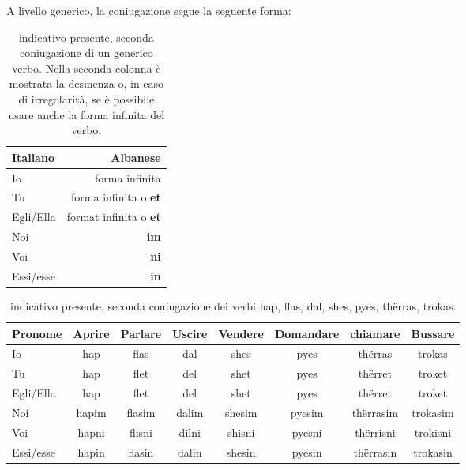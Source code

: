 A livello generico, la coniugazione segue la seguente forma:

\begin{table}[H]
    \centering
    \begin{tabular}{lr}
        \toprule
        Italiano    &   Albanese\\
        \midrule
        Io          &   forma infinita \\
        Tu          &   forma infinita o \textbf{et} \\
        Egli/Ella   &   format infinita o \textbf{et} \\
        Noi         &   \textbf{im} \\
        Voi         &   \textbf{ni} \\
        Essi/esse   &   \textbf{in} \\
        \bottomrule
    \end{tabular}
    \caption{indicativo presente, seconda coniugazione di un generico verbo. Nella seconda colonna è mostrata la desinenza o, in caso di irregolarità, se è possibile usare anche la forma infinita del verbo.}
    \label{tbl:verb:secondaconiugazione:indicativo:presente}
\end{table}

\begin{table}[H]
    \centering
    \begin{tabular}{lccccccc}
        \toprule
        Pronome     &   Aprire  & Parlare   & Uscire    & Vendere   & Domandare & chiamare & Bussare \\
        \midrule
        Io          &   hap     & flas      & dal       & shes      & pyes  & thërras   & trokas\\
        Tu          &   hap     & flet      & del       & shet      & pyes  & thërret   & troket\\
        Egli/Ella   &   hap     & flet      & del       & shet      & pyes &    thërret & troket\\
        Noi         &   hapim   & flasim    & dalim     & shesim    & pyesim    & thërrasim & trokasim\\
        Voi         &   hapni   & flisni    & dilni     & shisni    &pyesni     & thërrisni & trokisni\\
        Essi/esse   &   hapin   & flasin    & dalin     & shesin    & pyesin    & thërrasin & trokasin\\
        \bottomrule
    \end{tabular}
    \caption{indicativo presente, seconda coniugazione dei verbi hap, flas, dal, shes, pyes, thërras, trokas.}
    \label{tbl:verb:secondaconiugazione:indicativo:presente}
\end{table}


